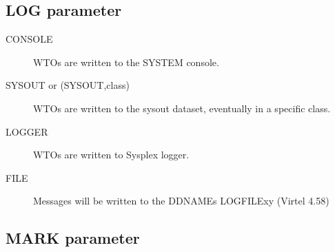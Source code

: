 \documentclass[letterpaper,10pt,english]{sphinxmanual}
\begin{document}
\ignorespaces 

\subsection{LOG parameter}
\label{\detokenize{Installation_Guide:log-parameter}}\label{\detokenize{Installation_Guide:index-87}}
\begin{sphinxVerbatim}[commandchars=\\\{\}]
                    
\end{sphinxVerbatim}
\begin{description}
\item[{CONSOLE}] \leavevmode
WTOs are written to the SYSTEM console.

\item[{SYSOUT or (SYSOUT,class)}] \leavevmode
WTOs are written to the sysout dataset, eventually in a specific class.

\item[{LOGGER}] \leavevmode
WTOs are written to Sysplex logger.

\item[{FILE}] \leavevmode
Messages will be written to the DDNAMEs LOGFILEx\textbar{}y               (Virtel 4.58)

\end{description}

\ignorespaces 

\subsection{MARK parameter}
\label{\detokenize{Installation_Guide:mark-parameter}}\label{\detokenize{Installation_Guide:index-88}}
\begin{sphinxVerbatim}[commandchars=\\\{\}]
                              
\end{sphinxVerbatim}
\end{document}

